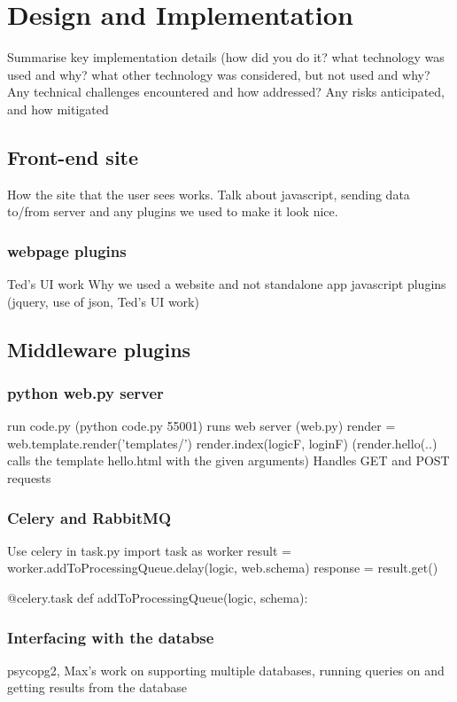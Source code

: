 \documentclass[a4paper, 11pt]{article}
\begin{document}
\section{Design and Implementation}
  Summarise key implementation details (how did you do it? what technology was
  used and why? what other technology was considered, but not used and why?
  Any technical challenges encountered and how addressed?  Any risks
  anticipated, and how mitigated

  \subsection{Front-end site}
    How the site that the user sees works. Talk about javascript, sending data
    to/from server and any plugins we used to make it look nice.

    \subsubsection{webpage plugins}
      Ted's UI work
      Why we used a website and not standalone app
      javascript plugins (jquery, use of json, Ted's UI work)

  \subsection{Middleware plugins}
    \subsubsection{python web.py server}
      run code.py (python code.py 55001)
        runs web server (web.py)
          render = web.template.render('templates/')
          render.index(logicF, loginF)
          (render.hello(..) calls the template hello.html with the given arguments)
          Handles GET and POST requests

    \subsubsection{Celery and RabbitMQ}
      Use celery in task.py
      import task as worker
      result = worker.addToProcessingQueue.delay(logic, web.schema)
      response = result.get()

      @celery.task
      def addToProcessingQueue(logic, schema):

      \subsubsection{Interfacing with the databse}
        psycopg2, Max's work on supporting multiple databases, running queries
        on and getting results from the database
\end{document}
